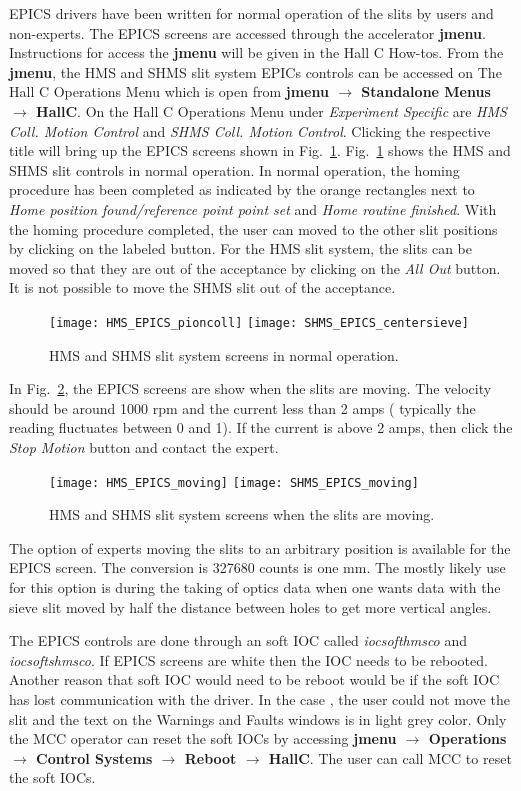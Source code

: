 EPICS drivers have been written for normal operation of the slits by users and non-experts. The
EPICS screens are accessed through the accelerator {\bf jmenu}. Instructions for access the 
  {\bf jmenu} will be given in the Hall C How-tos. 
From the  {\bf jmenu}, the HMS and SHMS slit system EPICs controls can be accessed on The Hall C Operations Menu
which is open from {\bf jmenu $\rightarrow$ Standalone Menus $\rightarrow$ HallC}. On the Hall C Operations Menu under
{\it Experiment Specific} are {\it HMS Coll. Motion Control} and {\it SHMS Coll. Motion Control}. Clicking the 
respective title will bring up the EPICS screens shown in Fig.~\ref{fig:normal-coll-epics}.  Fig.~\ref{fig:normal-coll-epics}
shows the HMS and SHMS slit controls in normal operation. In normal operation, the homing procedure has been completed
as indicated by the orange rectangles next to {\it Home position found/reference point point set} and {\it Home routine finished}.
With the homing procedure completed, the user can moved to the other slit positions by clicking on the labeled button. For the 
HMS slit system, the slits can be moved so that they are out of the acceptance by clicking on the {\it All Out} button. 
It is not possible to move the SHMS slit out of the acceptance.  
\begin{figure}
\texttt{[image: HMS\_EPICS\_pioncoll]}
\texttt{[image: SHMS\_EPICS\_centersieve]}
\caption{HMS and SHMS slit system screens in normal operation. \label{fig:normal-coll-epics}}
\end{figure}
In Fig.~\ref{fig:moving-coll-epics}, the EPICS screens are show when the slits are moving. The velocity should be around 1000 rpm and 
the current less than 2 amps ( typically the reading fluctuates between 0 and 1). If the current is above 2 amps, 
then click the {\it Stop Motion} button and contact the expert.
\begin{figure}
\texttt{[image: HMS\_EPICS\_moving]}
\texttt{[image: SHMS\_EPICS\_moving]}
\caption{HMS and SHMS slit system screens when the slits are moving. \label{fig:moving-coll-epics}}
\end{figure}
The option of experts moving the slits to an arbitrary position
is available for the EPICS screen. The conversion is 327680 counts is one mm. The mostly likely use for this option is during the 
taking of optics data when one wants data with the sieve slit moved by half the distance between holes to get more vertical angles.

The EPICS controls are done through an soft IOC called {\it  iocsofthmsco} and {\it iocsoftshmsco}. If EPICS screens are white then the IOC
needs to be rebooted. Another reason that soft IOC would need to be reboot would be if the soft IOC has lost communication with the driver.
In the case , the user could not move the slit and the text on the Warnings and Faults windows is in light grey color. Only the MCC operator can
reset the soft IOCs by accessing {\bf jmenu $\rightarrow$ Operations $\rightarrow$ Control Systems $\rightarrow$ Reboot $\rightarrow$ HallC}. The user can
call MCC to reset the soft IOCs.

